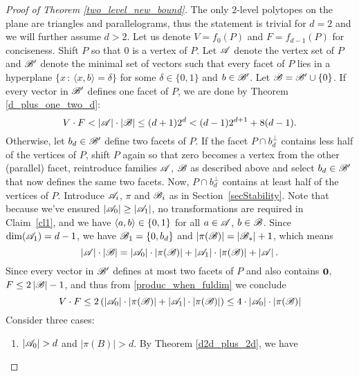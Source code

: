 \begin{proof}[Proof of Theorem \ref{two_level_new_bound}]
    The only $2$-level polytopes on the plane are triangles and parallelograms, thus the statement is trivial for $d=2$ and we will further assume $d > 2$. Let us denote $V=f_0(P)$ and $F=f_{d-1}(P)$ for conciseness. Shift $P$ so that $0$ is a vertex of $P$. Let ${\mathscr{A}}$ denote the vertex set of $P$ and ${\mathscr{B}}'$ denote the minimal set of vectors such that every facet of $P$ lies in a hyperplane $\{x\,:\,\langle x,b \rangle = \delta \}$ for some $\delta\in\{0,1\}$ and $b\in{\mathscr{B}}'$. Let ${\mathscr{B}} = {\mathscr{B}}' \cup \{0\}$.
    If every vector in ${\mathscr{B}}'$ defines one facet of $P$, we are done by Theorem \ref{d_plus_one_two_d}: 
    \[V\cdot F < \left|{\mathscr{A}}\right|\cdot\left|{\mathscr{B}}\right| \leq (d+1)2^d<(d-1)2^{d+1}+8(d-1).\]
    Otherwise, let $b_d\in{\mathscr{B}}'$ define two facets of $P$. If the facet $P\cap b_d^{\bot}$ contains less half of the vertices of $P$, shift $P$ again so that zero becomes a vertex from the other (parallel) facet, reintroduce families ${\mathscr{A}}$, ${\mathscr{B}}$ as described above and select $b_d\in{\mathscr{B}}'$ that now defines the same two facets. %
    Now, $P\cap b_d^{\bot}$ contains at least half of the vertices of $P$. Introduce ${\mathscr{A}}_i$, $\pi$ and ${\mathscr{B}}_i$ as in Section~\ref{secStability}. Note that because we've ensured $|{\mathscr{A}}_0|\geq|{\mathscr{A}}_1|$, no transformations are required in Claim~\ref{cl1}, and we have $\langle a, b\rangle \in \{0,1\}$ for all $a\in{\mathscr{A}}$, $b\in{\mathscr{B}}$.
    Since $\operatorname{dim}({\mathscr{A}}_1)=d-1$, we have ${\mathscr{B}}_1=\{0,b_d\}$ and $\left|\pi({\mathscr{B}})\right|=\left|{\mathscr{B}}_*\right|+1$, which means 
    \begin{equation}\label{produc_when_fuldim}
        \left|{\mathscr{A}}\right|\cdot\left|{\mathscr{B}}\right|=\left|{\mathscr{A}}_0\right|\cdot\left|\pi({\mathscr{B}})\right|+\left|{\mathscr{A}}_1\right|\cdot\left|\pi({\mathscr{B}})\right|+\left|{\mathscr{A}}\right|.
    \end{equation}
    Since every vector in ${\mathscr{B}}'$ defines at most two facets of $P$ and also contains $\mathbf{0}$, $F\le 2\left|{\mathscr{B}}\right| -1$, and thus from \eqref{produc_when_fuldim} we conclude
    \begin{equation}\label{VF_straightforward}
        V\cdot F \leq 2 \left(\left|{\mathscr{A}}_0\right|\cdot\left|\pi({\mathscr{B}})\right|+\left|{\mathscr{A}}_1\right|\cdot\left|\pi({\mathscr{B}})\right|\right) \leq 4\cdot\left|{\mathscr{A}}_0\right|\cdot\left|\pi({\mathscr{B}})\right|
    \end{equation}
    Consider three cases:
    \begin{enumerate}
        \item $\left|{\mathscr{A}}_0\right| > d$ and $\left|\pi(B)\right| > d$. By Theorem \ref{d2d_plus_2d}, we have

\end{enumerate}
\end{proof}
